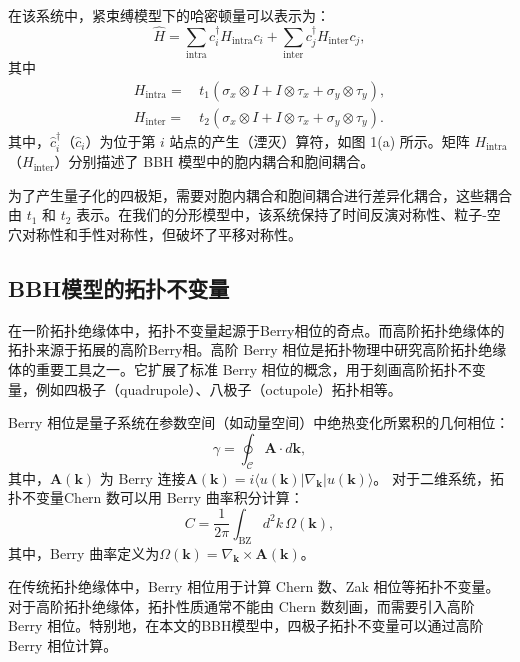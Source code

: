 在该系统中，紧束缚模型下的哈密顿量可以表示为：
\begin{equation}
\hat{H} = \sum_\text{intra} c_i^\dagger H_\text{intra} c_i + \sum_\text{inter} c_j^\dagger H_\text{inter} c_j,
\end{equation}
其中
\begin{equation}
\begin{aligned}
H_\text{intra} = & \, t_1 (\sigma_x \otimes I + I \otimes \tau_x + \sigma_y \otimes \tau_y), \\
H_\text{inter} = & \, t_2 (\sigma_x \otimes I + I \otimes \tau_x + \sigma_y \otimes \tau_y).
\end{aligned}
\end{equation}
其中，\( \hat{c}_i^\dagger \)（\( \hat{c}_i \)）为位于第 \( i \) 站点的产生（湮灭）算符，如图 1(a) 所示。矩阵 \( H_{\text{intra}} \)（\( H_{\text{inter}} \)）分别描述了 BBH 模型中的胞内耦合和胞间耦合。

为了产生量子化的四极矩，需要对胞内耦合和胞间耦合进行差异化耦合，这些耦合由 \( t_1 \) 和 \( t_2 \) 表示。在我们的分形模型中，该系统保持了时间反演对称性、粒子-空穴对称性和手性对称性，但破坏了平移对称性。

\subsection{BBH模型的拓扑不变量}
在一阶拓扑绝缘体中，拓扑不变量起源于Berry相位的奇点。而高阶拓扑绝缘体的拓扑来源于拓展的高阶Berry相。高阶 Berry 相位是拓扑物理中研究高阶拓扑绝缘体的重要工具之一。它扩展了标准 Berry 相位的概念，用于刻画高阶拓扑不变量，例如四极子（quadrupole）、八极子（octupole）拓扑相等。

Berry 相位是量子系统在参数空间（如动量空间）中绝热变化所累积的几何相位： 
\begin{equation}
    \gamma = \oint_{\mathcal{C}} \mathbf{A} \cdot d\mathbf{k},
\end{equation}
其中，\( \mathbf{A}(\mathbf{k}) \) 为 Berry 连接$\mathbf{A}(\mathbf{k}) = i \langle u(\mathbf{k}) | \nabla_{\mathbf{k}} | u(\mathbf{k}) \rangle$。
对于二维系统，拓扑不变量Chern 数可以用 Berry 曲率积分计算： 
\begin{equation}
    C = \frac{1}{2\pi} \int_{\text{BZ}} d^2k \, \Omega(\mathbf{k}),
\end{equation}
其中，Berry 曲率定义为$\Omega(\mathbf{k}) = \nabla_{\mathbf{k}} \times \mathbf{A}(\mathbf{k})$。

在传统拓扑绝缘体中，Berry 相位用于计算 Chern 数、Zak 相位等拓扑不变量。 对于高阶拓扑绝缘体，拓扑性质通常不能由 Chern 数刻画，而需要引入高阶 Berry 相位。特别地，在本文的BBH模型中，四极子拓扑不变量可以通过高阶 Berry 相位计算。

